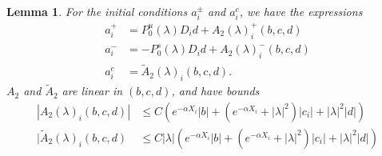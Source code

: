 \documentclass[10pt,reqno]{amsart}
\theoremstyle{plain}
\newtheorem{lemma}[theorem]{Lemma}
\theoremstyle{definition}
\theoremstyle{remark}
\numberwithin{theorem}{section}
\numberwithin{equation}{section}
\begin{document}
\begin{lemma}\label{lemma:aipm}
For the initial conditions $a_i^\pm$ and $a_i^c$, we have the expressions
\begin{equation}\label{aipmexp1}
\begin{aligned}
a_i^+ &= P_0^u(\lambda) D_i d + A_2(\lambda)_i^+(b, c, d) \\
a_i^- &= -P_0^s(\lambda) D_i d + A_2(\lambda)_i^-(b, c, d) \\
a_i^c &= \tilde{A}_2(\lambda)_i(b, c, d).
\end{aligned}
\end{equation}
$A_2$ and $\tilde{A}_2$ are linear in $(b, c, d)$, and have bounds
\begin{align}
|A_2(\lambda)_i(b, c, d)|
&\leq C \left(e^{-\alpha X_i}|b| + (e^{-\alpha X_i} + |\lambda|^2)|c_i| + |\lambda|^2|d| \right) \label{A2bound} \\
|\tilde{A}_2(\lambda)_i(b, c, d) &\leq C |\lambda| \left( e^{-\alpha X_i} |b| + (e^{-\alpha X_i} + |\lambda|^2) |c_i| +|\lambda|^2 |d| \right) \label{tildeA2bound}
\end{align}


\end{lemma}
\end{document}
